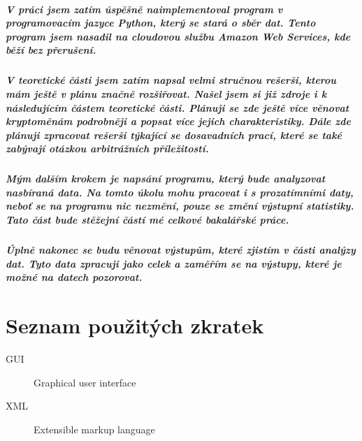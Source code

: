\documentclass[thesis=B,czech]{FITthesis}[2019/03/21]
\begin{document}
\begin{conclusion}
\paragraph{
V práci jsem zatím úspěšně naimplementoval program v programovacím jazyce Python, který se stará o sběr dat. Tento program jsem nasadil na cloudovou službu Amazon Web Services, kde běží bez přerušení. 
}
\paragraph{
V teoretické části jsem zatím napsal velmi stručnou rešerši, kterou mám ještě v plánu značně rozšiřovat. Našel jsem si již zdroje i k následujícím částem teoretické části.  Plánuji se zde ještě více věnovat kryptoměnám podrobněji a popsat více jejich charakteristiky. Dále zde plánuji zpracovat rešerši týkající se dosavadních prací, které se také zabývají otázkou arbitrážních příležitostí.
}
\paragraph{
Mým dalším krokem je napsání programu, který bude analyzovat nasbíraná data. Na tomto úkolu mohu pracovat i s prozatímními daty, neboť se na programu nic nezmění, pouze se změní výstupní statistiky. Tato část bude stěžejní částí mé celkové bakalářské práce.
}
\paragraph{
Úplně nakonec se budu věnovat výstupům, které zjistím v části analýzy dat. Tyto data zpracuji jako celek a zaměřím se na výstupy, které je možné na datech pozorovat.
}

\end{conclusion}




\appendix

\chapter{Seznam použitých zkratek}
\begin{description}
	\item[GUI] Graphical user interface
	\item[XML] Extensible markup language
\end{description}
\end{document}
